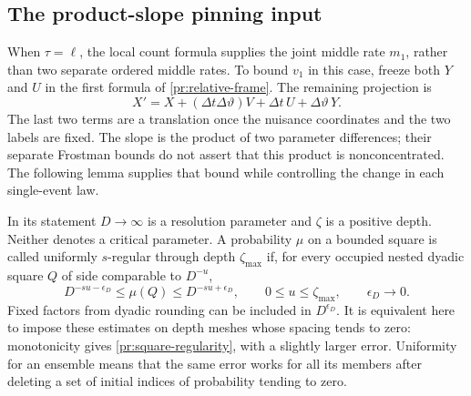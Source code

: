 \subsection{The product-slope pinning input}

When $\tau=\ell$, the local count formula supplies the joint middle
rate $m_1$, rather than two separate ordered middle rates. To bound
$v_1$ in this case, freeze both $Y$ and $U$ in the first formula of
\eqref{pr:relative-frame}. The remaining projection is
\[
 X'=X+(\Delta t\Delta\vartheta)V
                    +\Delta t\,U+\Delta\vartheta\,Y.
\]
The last two terms are a translation once the nuisance coordinates
and the two labels are fixed. The slope is the product of two
parameter differences; their separate Frostman bounds do not assert
that this product is nonconcentrated. The following lemma supplies
that bound while controlling the change in each single-event law.

In its statement $D\to\infty$ is a resolution parameter and $\zeta$
is a positive depth. Neither denotes a critical parameter.
A probability $\mu$ on a bounded square is called uniformly
$s$-regular through depth $\zeta_{\max}$ if, for every occupied
nested dyadic square $Q$ of side comparable to $D^{-u}$,
\begin{equation}
 D^{-su-\epsilon_D}\le\mu(Q)\le D^{-su+\epsilon_D},
 \qquad 0\le u\le\zeta_{\max},\qquad \epsilon_D\longrightarrow0.
\label{pr:square-regularity}
\end{equation}
Fixed factors from dyadic rounding can be included in
$D^{\epsilon_D}$. It is equivalent here to impose these estimates
on depth meshes whose spacing tends to zero: monotonicity gives
\eqref{pr:square-regularity}, with a slightly larger error.
Uniformity for an ensemble means that the same error works for all
its members after deleting a set of initial indices of probability
tending to zero.

